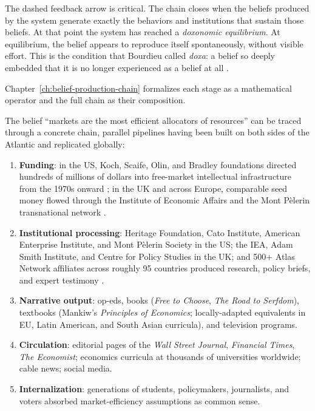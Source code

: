 The dashed feedback arrow is critical.
The chain closes when the beliefs produced by the system generate exactly the behaviors and institutions that sustain those beliefs.
At that point the system has reached a \emph{doxonomic equilibrium}.
At equilibrium, the belief appears to reproduce itself spontaneously, without visible effort.
This is the condition that Bourdieu called \textit{doxa}: a belief so deeply embedded that it is no longer experienced as a belief at all \autocite[pp.~164--170]{bourdieu1977}.

Chapter~\ref{ch:belief-production-chain} formalizes each stage as a mathematical operator and the full chain as their composition.

\begin{example}
\label{ex:neoliberal-chain}
The belief ``markets are the most efficient allocators of resources'' can be traced through a concrete chain, parallel pipelines having been built on both sides of the Atlantic and replicated globally:
\begin{enumerate}[nosep]
  \item \textbf{Funding}: in the US, Koch, Scaife, Olin, and Bradley foundations directed hundreds of millions of dollars into free-market intellectual infrastructure from the 1970s onward \autocite{mayer2016}; in the UK and across Europe, comparable seed money flowed through the Institute of Economic Affairs and the Mont P\`elerin transnational network \autocite{cockett1994, plehwe2006}.
  \item \textbf{Institutional processing}: Heritage Foundation, Cato Institute, American Enterprise Institute, and Mont P\`{e}lerin Society in the US; the IEA, Adam Smith Institute, and Centre for Policy Studies in the UK; and 500+ Atlas Network affiliates across roughly 95 countries produced research, policy briefs, and expert testimony \autocite{mirowski2009, djelic2014}.
  \item \textbf{Narrative output}: op-eds, books (\textit{Free to Choose}, \textit{The Road to Serfdom}), textbooks (Mankiw's \textit{Principles of Economics}; locally-adapted equivalents in EU, Latin American, and South Asian curricula), and television programs.
  \item \textbf{Circulation}: editorial pages of the \textit{Wall Street Journal}, \textit{Financial Times}, \textit{The Economist}; economics curricula at thousands of universities worldwide; cable news; social media.
  \item \textbf{Internalization}: generations of students, policymakers, journalists, and voters absorbed market-efficiency assumptions as common sense.

\end{enumerate}
\end{example}
